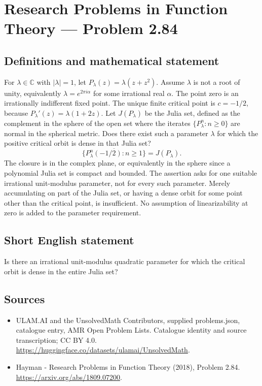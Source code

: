 \documentclass[11pt,a4paper]{article}
\begin{document}
\section*{Research Problems in Function Theory — Problem 2.84}\label{statement}

\subsection{Definitions and mathematical statement}
For $\lambda\in\mathbb C$ with $|\lambda|=1$, let
$P_\lambda(z)=\lambda(z+z^2)$. Assume $\lambda$ is not a root of unity, equivalently $\lambda=e^{2\pi i\alpha}$ for some irrational real $\alpha$. The point zero is an irrationally indifferent fixed point. The unique finite critical point is $c=-1/2$, because $P_\lambda'(z)=\lambda(1+2z)$.
Let $J(P_\lambda)$ be the Julia set, defined as the complement in the sphere of the open set where the iterates $\{P_\lambda^n:n\ge0\}$ are normal in the spherical metric. Does there exist such a parameter $\lambda$ for which the positive critical orbit is dense in that Julia set?
\[
\overline{\{P_\lambda^n(-1/2):n\ge1\}}=J(P_\lambda).
\]
The closure is in the complex plane, or equivalently in the sphere since a polynomial Julia set is compact and bounded. The assertion asks for one suitable irrational unit-modulus parameter, not for every such parameter. Merely accumulating on part of the Julia set, or having a dense orbit for some point other than the critical point, is insufficient. No assumption of linearizability at zero is added to the parameter requirement.
\subsection{Short English statement}
Is there an irrational unit-modulus quadratic parameter for which the critical orbit is dense in the entire Julia set?
\subsection{Sources}
\begin{itemize}
\item[S1] ULAM.AI and the UnsolvedMath Contributors, supplied problems.json, catalogue entry, AMR Open Problem Lists. Catalogue identity and source transcription; CC BY 4.0.
\url{https://huggingface.co/datasets/ulamai/UnsolvedMath}.
\item[S2] Hayman - Research Problems in Function Theory (2018), Problem 2.84. 
\url{https://arxiv.org/abs/1809.07200}.
\end{itemize}
\end{document}
